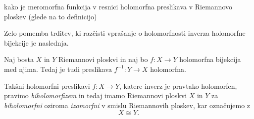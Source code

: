 \documentclass[mat1]{fmfdelo}
\numberwithin{equation}{section}
\newcommand{\inv}{^{-1}}
\theoremstyle{definition}
\begin{document}

\begin{zgled*}
    kako je meromorfna funkcija v resnici holomorfna preslikava v Riemannovo ploskev (glede na to definicijo)
\end{zgled*}

Zelo pomemba trditev, ki razčisti vprašanje o  holomorfnosti inverza holomorfne bijekcije je naslednja. 

\begin{trditev}
    \label{holomorfna bijekcija je biholomorfizem}
    Naj bosta $X$ in $Y$ Riemannovi ploskvi in naj bo $f: X \to Y$ holomorfna bijekcija med njima. Tedaj je tudi preslikava $f\inv : Y \to X$ holomorfna.
\end{trditev}

\begin{opomba}
    Takšni holomorfni preslikavi $f : X \to Y$, katere inverz je pravtako holomorfen, pravimo \emph{biholomorfizem} in tedaj imamo Riemannovi ploskvi $X$ in $Y$ za \emph{biholomorfni} oziroma \emph{izomorfni} v smislu Riemannovih ploskev, kar označujemo z 
    \[
        X \cong Y.
    \]
\end{opomba}
\end{document}
